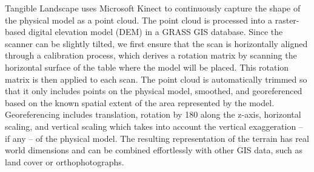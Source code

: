\documentclass[prodmode,acmtochi]{acmsmall} %
\begin{document}



Tangible Landscape uses Microsoft Kinect
to continuously capture the shape of the physical model
as a point cloud.
The point cloud is processed into a 
raster-based digital elevation model (DEM) 
in a GRASS GIS database.
Since the scanner can be slightly tilted,
we first ensure that the scan is horizontally aligned
through a calibration process, which derives
a rotation matrix by scanning the horizontal surface 
of the table where the model will be placed.
This rotation matrix is then applied to each scan.
The point cloud is automatically trimmed 
so that it only includes points on the physical model,
smoothed, and georeferenced based on the known
spatial extent of the area represented by the model.
Georeferencing includes translation, 
rotation by 180\textdegree{} along the z-axis,
horizontal scaling, and vertical scaling 
which takes into account the vertical exaggeration 
-- if any -- of the physical model.
The resulting representation of the terrain 
has real world dimensions
and can be combined effortlessly with other GIS data, 
such as land cover or orthophotographs.
\end{document}
